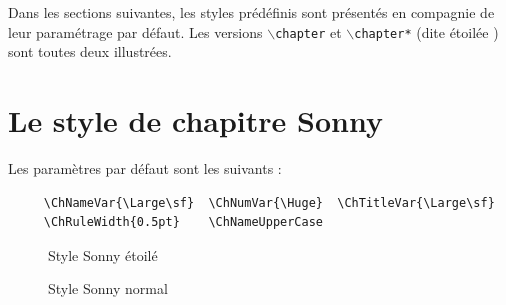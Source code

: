 \documentclass{report}
\newcommand{\A}[1]{{$\backslash${\tt #1}}}
\begin{document}
    Dans les sections suivantes, les styles prédéfinis sont présentés en 
    compagnie de leur paramétrage par défaut. Les versions \A{chapter} 
    et \A{chapter*} (dite \og étoilée \fg{}) sont toutes deux illustrées.

    \section{Le style de chapitre Sonny}
    Les paramètres par défaut sont les suivants :
    {\small\begin{verbatim}  
     \ChNameVar{\Large\sf}  \ChNumVar{\Huge}  \ChTitleVar{\Large\sf}
     \ChRuleWidth{0.5pt}    \ChNameUpperCase
    \end{verbatim}}    
    \begin{figure}[h]
      \begin{minipage}{7 cm}
        \label{fig:Sonnys}
        \centerline{\color{gray!25}} 
        \caption{Style Sonny \og étoilé \fg{}}
      \end{minipage}\hfill
      \begin{minipage}{7 cm}
        \label{fig:Sonny}
        \centerline{\color{gray!25}}
        \caption{Style Sonny  \og normal \fg{}}
      \end{minipage}\hfill
    \end{figure}    
    
\end{document}
